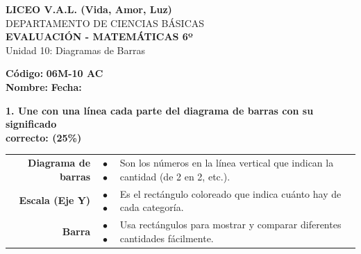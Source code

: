 \documentclass[12pt, letterpaper]{article}
\begin{document}
	
	\begin{center}
		{\Large \textbf{LICEO V.A.L. (Vida, Amor, Luz)}}\\[0.1cm]
		{\large DEPARTAMENTO DE CIENCIAS BÁSICAS}\\[0.1cm]
		\textbf{EVALUACIÓN - MATEMÁTICAS 6º}\\[0.1cm]
		Unidad 10: Diagramas de Barras
	\end{center}
	
	
	\hfill \textbf{Código:} \textbf{06M-10 AC}\\
	
	\noindent \textbf{Nombre:} \underline{\hspace{8cm}} \hspace{1cm}\textbf{Fecha:} \underline{\hspace{3cm}}
	
	\vspace{0.6cm}
	
	\noindent \textbf{1. Une con una línea cada parte del diagrama de barras con su significado \\
		correcto: \hfill(25\%)}
	
	\begin{center}
		\renewcommand{\arraystretch}{2}
		\begin{tabular}{r c m{9cm}} 
			\textbf{\Large Diagrama de barras} & \hspace{0.5cm} $\bullet$ \hspace{1.5cm} $\bullet$ \hspace{0.5cm} & \large Son los números en la línea vertical que indican la cantidad (de 2 en 2, etc.).\\[0.2cm]
			\textbf{\Large Escala (Eje Y)}   & \hspace{0.5cm} $\bullet$ \hspace{1.5cm} $\bullet$ \hspace{0.5cm} & \large Es el rectángulo coloreado que indica cuánto hay de cada categoría.\\[0.2cm]
			\textbf{\Large Barra}    & \hspace{0.5cm} $\bullet$ \hspace{1.5cm} $\bullet$ \hspace{0.5cm} & \large Usa rectángulos para mostrar y comparar diferentes cantidades fácilmente.
		\end{tabular}
	\end{center}
	
	\vspace{0.6cm}
	
\end{document}
